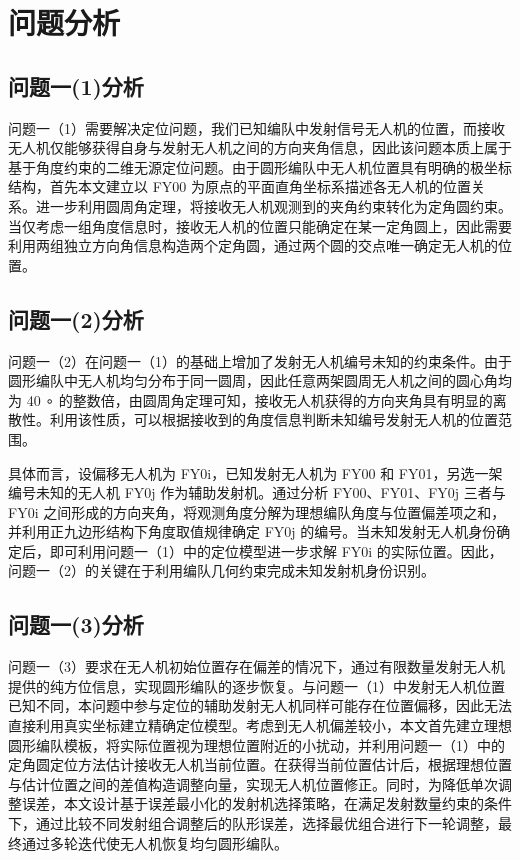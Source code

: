 \documentclass[UTF-8,a4paper,zihao=-4]{ctexart}
\begin{document}
\section{问题分析}
\subsection{问题一(1)分析}
问题一（1）需要解决定位问题，我们已知编队中发射信号无人机的位置，而接收无人机仅能够获得自身与发射无人机之间的方向夹角信息，因此该问题本质上属于基于角度约束的二维无源定位问题。由于圆形编队中无人机位置具有明确的极坐标结构，首先本文建立以 FY00 为原点的平面直角坐标系描述各无人机的位置关系。进一步利用圆周角定理，将接收无人机观测到的夹角约束转化为定角圆约束。当仅考虑一组角度信息时，接收无人机的位置只能确定在某一定角圆上，因此需要利用两组独立方向角信息构造两个定角圆，通过两个圆的交点唯一确定无人机的位置。

\subsection{问题一(2)分析}

问题一（2）在问题一（1）的基础上增加了发射无人机编号未知的约束条件。由于圆形编队中无人机均匀分布于同一圆周，因此任意两架圆周无人机之间的圆心角均为 40
∘
 的整数倍，由圆周角定理可知，接收无人机获得的方向夹角具有明显的离散性。利用该性质，可以根据接收到的角度信息判断未知编号发射无人机的位置范围。

具体而言，设偏移无人机为 FY0i，已知发射无人机为 FY00 和 FY01，另选一架编号未知的无人机 FY0j 作为辅助发射机。通过分析 FY00、FY01、FY0j 三者与 FY0i 之间形成的方向夹角，将观测角度分解为理想编队角度与位置偏差项之和，并利用正九边形结构下角度取值规律确定 FY0j 的编号。当未知发射无人机身份确定后，即可利用问题一（1）中的定位模型进一步求解 FY0i 的实际位置。因此，问题一（2）的关键在于利用编队几何约束完成未知发射机身份识别。

\subsection{问题一(3)分析}

问题一（3）要求在无人机初始位置存在偏差的情况下，通过有限数量发射无人机提供的纯方位信息，实现圆形编队的逐步恢复。与问题一（1）中发射无人机位置已知不同，本问题中参与定位的辅助发射无人机同样可能存在位置偏移，因此无法直接利用真实坐标建立精确定位模型。考虑到无人机偏差较小，本文首先建立理想圆形编队模板，将实际位置视为理想位置附近的小扰动，并利用问题一（1）中的定角圆定位方法估计接收无人机当前位置。在获得当前位置估计后，根据理想位置与估计位置之间的差值构造调整向量，实现无人机位置修正。同时，为降低单次调整误差，本文设计基于误差最小化的发射机选择策略，在满足发射数量约束的条件下，通过比较不同发射组合调整后的队形误差，选择最优组合进行下一轮调整，最终通过多轮迭代使无人机恢复均匀圆形编队。
\end{document}
